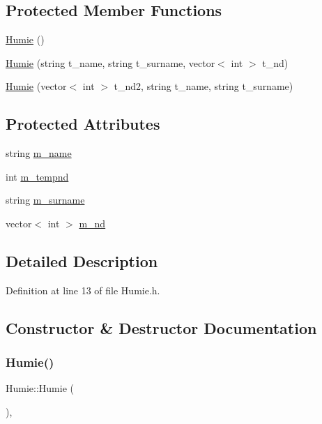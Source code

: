 \subsection*{Protected Member Functions}
\begin{DoxyCompactItemize}
\item 
\mbox{\hyperlink{class_humie_a9a042aaece31359fe6fed36471e6c45a}{Humie}} ()
\item 
\mbox{\hyperlink{class_humie_aaf022723e87d5b942b75ac0f3886040f}{Humie}} (string t\+\_\+name, string t\+\_\+surname, vector$<$ int $>$ t\+\_\+nd)
\item 
\mbox{\hyperlink{class_humie_a81c0810d76013148334772fbcaceaf93}{Humie}} (vector$<$ int $>$ t\+\_\+nd2, string t\+\_\+name, string t\+\_\+surname)
\end{DoxyCompactItemize}
\subsection*{Protected Attributes}
\begin{DoxyCompactItemize}
\item 
string \mbox{\hyperlink{class_humie_ad1721cb953022792ff05eadc1b18bd13}{m\+\_\+name}}
\item 
int \mbox{\hyperlink{class_humie_ab8dcd72d3da064284d0628271783771b}{m\+\_\+tempnd}}
\item 
string \mbox{\hyperlink{class_humie_a2ff317d172dd031ad358edaf6971afb2}{m\+\_\+surname}}
\item 
vector$<$ int $>$ \mbox{\hyperlink{class_humie_ad1f9a0feba7e326695739192f6f317fb}{m\+\_\+nd}}
\end{DoxyCompactItemize}


\subsection{Detailed Description}


Definition at line 13 of file Humie.\+h.



\subsection{Constructor \& Destructor Documentation}
\mbox{\label{class_humie_a9a042aaece31359fe6fed36471e6c45a}} 
\subsubsection{\texorpdfstring{Humie()}{Humie()}\hspace{0.1cm}{\footnotesize\ttfamily [1/3]}}
{\footnotesize\ttfamily Humie\+::\+Humie (\begin{DoxyParamCaption}{ }\end{DoxyParamCaption})\hspace{0.3cm}{\ttfamily [inline]}, {\ttfamily [protected]}}




